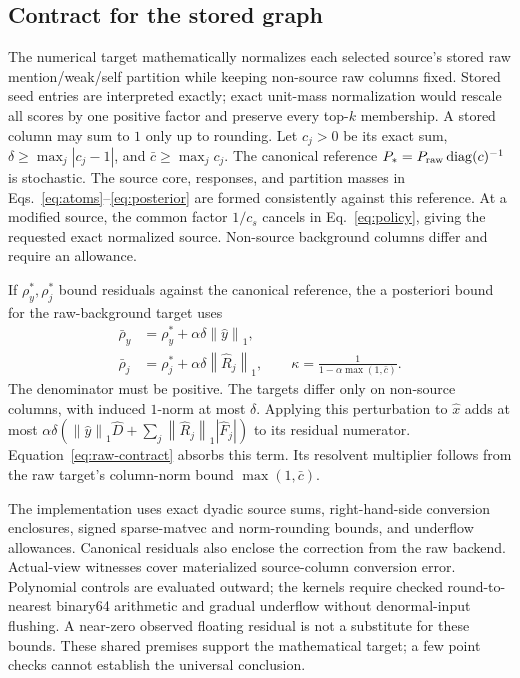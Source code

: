 \documentclass[conference]{IEEEtran}
\newcommand{\norm}[1]{\left\lVert#1\right\rVert_1}
\begin{document}
\subsection{Contract for the stored graph}
\label{sec:raw}
The numerical target mathematically normalizes each selected source's stored raw mention/weak/self partition while keeping non-source raw columns fixed. Stored seed entries are interpreted exactly; exact unit-mass normalization would rescale all scores by one positive factor and preserve every top-$k$ membership. A stored column may sum to $1$ only up to rounding. Let $c_j>0$ be its exact sum, $\delta\geq\max_j|c_j-1|$, and $\bar c\geq\max_jc_j$. The canonical reference $P_*=P_{\rm raw}\operatorname{diag}(c)^{-1}$ is stochastic. The source core, responses, and partition masses in Eqs.~\eqref{eq:atoms}--\eqref{eq:posterior} are formed consistently against this reference. At a modified source, the common factor $1/c_s$ cancels in Eq.~\eqref{eq:policy}, giving the requested exact normalized source. Non-source background columns differ and require an allowance.

If $\rho_y^*,\rho_j^*$ bound residuals against the canonical reference, the a posteriori bound for the raw-background target uses
\begin{equation}
 \begin{aligned}
 \bar\rho_y&=\rho_y^*+\alpha\delta\norm{\widehat y},\\
 \bar\rho_j&=\rho_j^*+\alpha\delta\norm{\widehat R_j},\qquad
 \kappa=\frac1{1-\alpha\max(1,\bar c)}.
 \end{aligned}
 \label{eq:raw-contract}
\end{equation}
The denominator must be positive. The targets differ only on non-source columns, with induced $1$-norm at most $\delta$. Applying this perturbation to $\widehat x$ adds at most $\alpha\delta(\norm{\widehat y}\widehat D+\sum_j\norm{\widehat R_j}|\widehat F_j|)$ to its residual numerator. Equation~\eqref{eq:raw-contract} absorbs this term. Its resolvent multiplier follows from the raw target's column-norm bound $\max(1,\bar c)$.

The implementation uses exact dyadic source sums, right-hand-side conversion enclosures, signed sparse-matvec and norm-rounding bounds, and underflow allowances. Canonical residuals also enclose the correction from the raw backend. Actual-view witnesses cover materialized source-column conversion error. Polynomial controls are evaluated outward; the kernels require checked round-to-nearest binary64 arithmetic and gradual underflow without denormal-input flushing. A near-zero observed floating residual is not a substitute for these bounds. These shared premises support the mathematical target; a few point checks cannot establish the universal conclusion.
\end{document}
